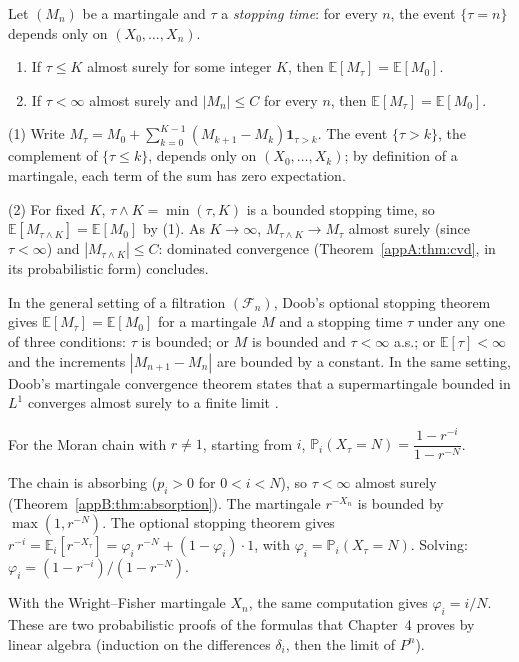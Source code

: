 \begin{theorem}\label{appB:thm:arret}
Let $(M_n)$ be a martingale and $\tau$ a \emph{stopping time}: for every $n$, the event $\{\tau=n\}$ depends only on
$(X_0,\dots,X_n)$.
\begin{enumerate}
\item If $\tau\le K$ almost surely for some integer $K$, then $\mathbb E[M_\tau]=\mathbb E[M_0]$.
\item If $\tau<\infty$ almost surely and $|M_n|\le C$ for every $n$, then $\mathbb E[M_\tau]=\mathbb E[M_0]$.
\end{enumerate}
\end{theorem}

\begin{humanproof}
(1) Write $M_\tau=M_0+\sum_{k=0}^{K-1}(M_{k+1}-M_k)\mathbf 1_{\tau>k}$. The event $\{\tau>k\}$, the complement of
$\{\tau\le k\}$, depends only on $(X_0,\dots,X_k)$; by definition of a martingale, each term of the sum has
zero expectation.

(2) For fixed $K$, $\tau\wedge K=\min(\tau,K)$ is a bounded stopping time, so $\mathbb E[M_{\tau\wedge
K}]=\mathbb E[M_0]$ by (1). As $K\to\infty$, $M_{\tau\wedge K}\to M_\tau$ almost surely (since $\tau<\infty$) and
$|M_{\tau\wedge K}|\le C$: dominated convergence (Theorem~\ref{appA:thm:cvd}, in its probabilistic form) concludes.
\end{humanproof}

\begin{uniremark}\tierL{} In the general setting of a filtration $(\mathcal F_n)$, Doob's optional stopping theorem
gives $\mathbb E[M_\tau]=\mathbb E[M_0]$ for a martingale $M$ and a stopping time $\tau$ under any one of three
conditions: $\tau$ is bounded; or $M$ is bounded and $\tau<\infty$ a.s.; or $\mathbb E[\tau]<\infty$ and the increments
$|M_{n+1}-M_n|$ are bounded by a constant. In the same setting, Doob's martingale convergence theorem states that a
supermartingale bounded in $L^1$ converges almost surely to a finite limit \cite{app:williams}.
\end{uniremark}

\begin{corollary}\label{appB:cor:ruine}
For the Moran chain with $r\ne1$, starting from $i$, $\mathbb P_i(X_\tau=N)=\dfrac{1-r^{-i}}{1-r^{-N}}$.
\end{corollary}

\begin{humanproof}
The chain is absorbing ($p_i>0$ for $0<i<N$), so $\tau<\infty$ almost surely (Theorem~\ref{appB:thm:absorption}).
The martingale $r^{-X_n}$ is bounded by $\max(1,r^{-N})$. The optional stopping theorem gives
$r^{-i}=\mathbb E_i[r^{-X_\tau}]=\varphi_i\,r^{-N}+(1-\varphi_i)\cdot1$, with $\varphi_i=\mathbb P_i(X_\tau=N)$.
Solving: $\varphi_i=(1-r^{-i})/(1-r^{-N})$.
\end{humanproof}
With the Wright--Fisher martingale $X_n$, the same computation gives $\varphi_i=i/N$. These are two probabilistic
proofs of the formulas that Chapter~4 proves by linear algebra (induction on the differences
$\delta_i$, then the limit of $P^n$).

